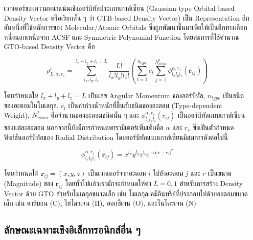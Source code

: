 เวกเตอร์ของความหนาแน่นเชิงออร์บิทัลประเภทเกาส์เซียน (Gaussian-type Orbital-based Density Vector หรือเรียกสั้น ๆ ว่า GTB-based Density Vector) เป็น Representation อีกอันหนึ่งที่ใช้หลักการของ Molecular/Atomic Orbitals ซึ่งถูกพัฒนาขึ้นมาเพื่อให้เป็นอีกทางเลือกหนึ่งนอกเหนือจาก ACSF และ Symmetric Polynomial Function\autocite{kwac2021} โดยสมการที่ใช้คำนวณ GTO-based Density Vector คือ

\begin{equation}\label{eq:gto_density}
    \rho^{i}_{L,\alpha,r_{s}} = \sum^{l_{x}+l_{y}+l_{z} = L}_{l_{x},l_{y},l_{z}}
    \frac{L!}{l_{x}!l_{y}!l_{z}!} \left ( \sum^{n_{type}}_{t=1} c_{t} \sum^{N^{t}_{atom}}_{j=1}
    \phi^{\alpha,r_{s}}_{l_{x}l_{y}l_{z}} (\bm{r}_{ij}) \right )
\end{equation}

\noindent โดยกำหนดให้ $l_{x}+l_{y}+l_{z} = L$ เป็นเลข Angular Momentum ของออร์บิทัล, $n_{type}$ เป็นชนิดของอะตอมในโมเลกุล, $c_{t}$ เป็นค่าถ่วงน้ำหนักที่ขึ้นกับชนิดของอะตอม (Type-dependent Weight), $N^{t}_{atom}$ คือจำนวนของอะตอมชนิดนั้น ๆ และ $\phi^{\alpha,r_{s}}_{l_{x}l_{y}l_{z}} (r_{ij})$ เป็นออร์บิทัลแบบเกาส์เซียนของแต่ละอะตอม นอกจากนี้ยังมีการกำหนดพารามิเตอร์เพิ่มเติมคือ $\alpha$ และ $r_{s}$ ซึ่งเป็นตัวกำหนดฟังก์ชันออร์บิทัลของ Radial Distribution\autocite{kwac2021} โดยออร์บิทัลแบบเกาส์เซียนมีสมการดังต่อไปนี้

\begin{equation}\label{eq:gaussian_orb}
    \phi^{\alpha,r_{s}}_{l_{x}l_{y}l_{z}} (\bm{r}_{ij}) = x^{l_{x}}y^{l_{y}}z^{l_{z}} e^{-\alpha
    |r-r_{s}|^{2}}
\end{equation}

\noindent โดยกำหนดให้ $\bm{r}_{ij} = (x,y,z)$ เป็นเวกเตอร์จากอะตอม $i$ ไปยังอะตอม $j$ และ $r$ เป็นขนาด (Magnitude) ของ $\bm{r}_{ij}$ โดยทั่วไปแล้วเรามักจะกำหนดให้ค่า $L=0,1$ สำหรับการสร้าง Density Vector ด้วย GTO สำหรับโมเลกุลขนาดเล็ก เช่น โมเลกุลเคมีอินทรีย์ที่ประกอบไปด้วยอะตอมขนาดเล็ก เช่น คาร์บอน (C), ไฮโดรเจน (H), ออกซิเจน (O), และไนโตรเจน (N)

\subsection{ลักษณะเฉพาะเชิงอิเล็กทรอนิกส์อื่น ๆ}
\label{ssec:other_feat_elec}


